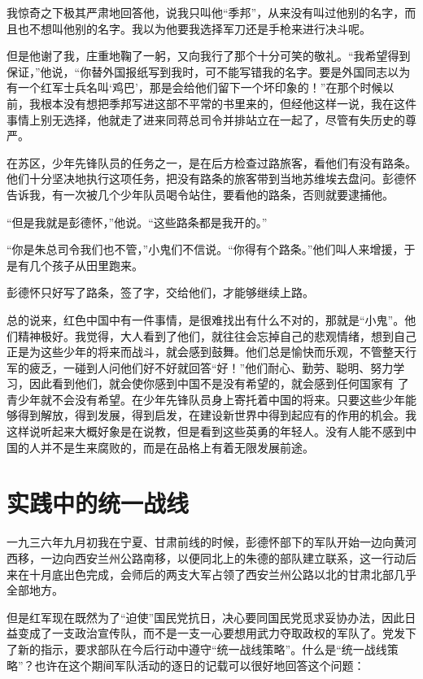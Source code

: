 \documentclass[10pt]{book}
\begin{document}
我惊奇之下极其严肃地回答他，说我只叫他“季邦”，从来没有叫过他别的名字，而且也不想叫他别的名字。我以为他要我选择军刀还是手枪来进行决斗呢。

但是他谢了我，庄重地鞠了一躬，又向我行了那个十分可笑的敬礼。“我希望得到保证，”他说，“你替外国报纸写到我时，可不能写错我的名字。要是外国同志以为有一个红军士兵名叫‘鸡巴’，那是会给他们留下一个坏印象的！”在那个时候以前，我根本没有想把季邦写进这部不平常的书里来的，但经他这样一说，我在这件事情上别无选择，他就走了进来同蒋总司令并排站立在一起了，尽管有失历史的尊严。

在苏区，少年先锋队员的任务之一，是在后方检查过路旅客，看他们有没有路条。他们十分坚决地执行这项任务，把没有路条的旅客带到当地苏维埃去盘问。彭德怀告诉我，有一次被几个少年队员喝令站住，要看他的路条，否则就要逮捕他。

“但是我就是彭德怀，”他说。“这些路条都是我开的。”

“你是朱总司令我们也不管，”小鬼们不信说。“你得有个路条。”他们叫人来增援，于是有几个孩子从田里跑来。

彭德怀只好写了路条，签了字，交给他们，才能够继续上路。

总的说来，红色中国中有一件事情，是很难找出有什么不对的，那就是“小鬼”。他们精神极好。我觉得，大人看到了他们，就往往会忘掉自己的悲观情绪，想到自己正是为这些少年的将来而战斗，就会感到鼓舞。他们总是愉快而乐观，不管整天行军的疲乏，一碰到人问他们好不好就回答“好！”他们耐心、勤劳、聪明、努力学习，因此看到他们，就会使你感到中国不是没有希望的，就会感到任何国家有 了青少年就不会没有希望。在少年先锋队员身上寄托着中国的将来。只要这些少年能够得到解放，得到发展，得到启发，在建设新世界中得到起应有的作用的机会。我这样说听起来大概好象是在说教，但是看到这些英勇的年轻人。没有人能不感到中国的人并不是生来腐败的，而是在品格上有着无限发展前途。

\section{实践中的统一战线}

一九三六年九月初我在宁夏、甘肃前线的时候，彭德怀部下的军队开始一边向黄河西移，一边向西安兰州公路南移，以便同北上的朱德的部队建立联系，这一行动后来在十月底出色完成，会师后的两支大军占领了西安兰州公路以北的甘肃北部几乎全部地方。

但是红军现在既然为了“迫使”国民党抗日，决心要同国民党觅求妥协办法，因此日益变成了一支政治宣传队，而不是一支一心要想用武力夺取政权的军队了。党发下了新的指示，要求部队在今后行动中遵守“统一战线策略”。什么是“统一战线策略”？也许在这个期间军队活动的逐日的记载可以很好地回答这个问题：
\end{document}

